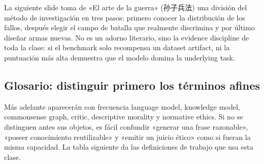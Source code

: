 
La siguiente slide toma de «El arte de la guerra» (孙子兵法) una división del método de investigación en tres pasos: primero conocer la distribución de los fallos, después elegir el campo de batalla que realmente discrimina y por último diseñar armas nuevas. No es un adorno literario, sino la evidence discipline de toda la clase: si el benchmark solo recompensa un dataset artifact, ni la puntuación más alta demuestra que el modelo domina la underlying task.



\subsection{Glosario: distinguir primero los términos afines}

Más adelante aparecerán con frecuencia language model, knowledge model, commonsense graph, critic, descriptive morality y normative ethics. Si no se distinguen antes sus objetos, es fácil confundir «generar una frase razonable», «poseer conocimiento reutilizable» y «emitir un juicio ético» como si fueran la misma capacidad. La tabla siguiente da las definiciones de trabajo que usa esta clase.

